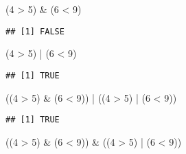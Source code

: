 \documentclass[
]{article}
\newenvironment{Shaded}{\begin{snugshade}}{\end{snugshade}}
\newcommand{\DecValTok}[1]{\textcolor[rgb]{0.00,0.00,0.81}{#1}}
\newcommand{\NormalTok}[1]{#1}
\newcommand{\SpecialCharTok}[1]{\textcolor[rgb]{0.00,0.00,0.00}{#1}}
\begin{document}
\begin{Shaded}
\begin{Highlighting}[]
\NormalTok{(}\DecValTok{4} \SpecialCharTok{\textgreater{}} \DecValTok{5}\NormalTok{) }\SpecialCharTok{\&}\NormalTok{ (}\DecValTok{6} \SpecialCharTok{\textless{}} \DecValTok{9}\NormalTok{)}
\end{Highlighting}
\end{Shaded}

\begin{verbatim}
## [1] FALSE
\end{verbatim}

\begin{Shaded}
\begin{Highlighting}[]
\NormalTok{(}\DecValTok{4} \SpecialCharTok{\textgreater{}} \DecValTok{5}\NormalTok{) }\SpecialCharTok{|}\NormalTok{ (}\DecValTok{6} \SpecialCharTok{\textless{}} \DecValTok{9}\NormalTok{)}
\end{Highlighting}
\end{Shaded}

\begin{verbatim}
## [1] TRUE
\end{verbatim}

\begin{Shaded}
\begin{Highlighting}[]
\NormalTok{((}\DecValTok{4} \SpecialCharTok{\textgreater{}} \DecValTok{5}\NormalTok{) }\SpecialCharTok{\&}\NormalTok{ (}\DecValTok{6} \SpecialCharTok{\textless{}} \DecValTok{9}\NormalTok{)) }\SpecialCharTok{|}\NormalTok{ ((}\DecValTok{4} \SpecialCharTok{\textgreater{}} \DecValTok{5}\NormalTok{) }\SpecialCharTok{|}\NormalTok{ (}\DecValTok{6} \SpecialCharTok{\textless{}} \DecValTok{9}\NormalTok{))}
\end{Highlighting}
\end{Shaded}

\begin{verbatim}
## [1] TRUE
\end{verbatim}

\begin{Shaded}
\begin{Highlighting}[]
\NormalTok{((}\DecValTok{4} \SpecialCharTok{\textgreater{}} \DecValTok{5}\NormalTok{) }\SpecialCharTok{\&}\NormalTok{ (}\DecValTok{6} \SpecialCharTok{\textless{}} \DecValTok{9}\NormalTok{)) }\SpecialCharTok{\&}\NormalTok{ ((}\DecValTok{4} \SpecialCharTok{\textgreater{}} \DecValTok{5}\NormalTok{) }\SpecialCharTok{|}\NormalTok{ (}\DecValTok{6} \SpecialCharTok{\textless{}} \DecValTok{9}\NormalTok{))}
\end{Highlighting}
\end{Shaded}
\end{document}
